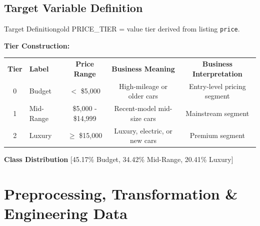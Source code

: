 \documentclass[12pt, a4paper]{article}
\begin{document}
\subsection{Target Variable Definition}
\begin{databox}{Target Definition}{gold}
PRICE\_TIER = value tier derived from listing \texttt{price}.
\end{databox}

\textbf{Tier Construction:}
\begin{center}
\renewcommand{\arraystretch}{1.6}
\begin{tabular}{c l c c c}
  \rowcolor{slate}
  {\color{white}\small\bfseries Tier} &
  {\color{white}\small\bfseries Label} &
  {\color{white}\small\bfseries Price Range} &
  {\color{white}\small\bfseries Business Meaning} &
  {\color{white}\small\bfseries Business Interpretation}\\
  \rowcolor{lightgray}
  0 & Budget & $<$ \$5,000 & High-mileage or older cars & Entry-level pricing segment \\
  \rowcolor{white}
  1 & Mid-Range &  \$5,000 - \$14,999 & Recent-model mid-size cars & Mainstream segment\\
  \rowcolor{lightgray}
  2 & Luxury & $\geq$ \$15,000 & Luxury, electric, or new cars & Premium segment\\
\end{tabular}
\end{center}
\vspace{0.25cm}
\textbf{Class Distribution} [45.17\% Budget, 34.42\% Mid-Range, 20.41\% Luxury]
\newpage
\section{Preprocessing, Transformation \& Engineering Data}
\end{document}
